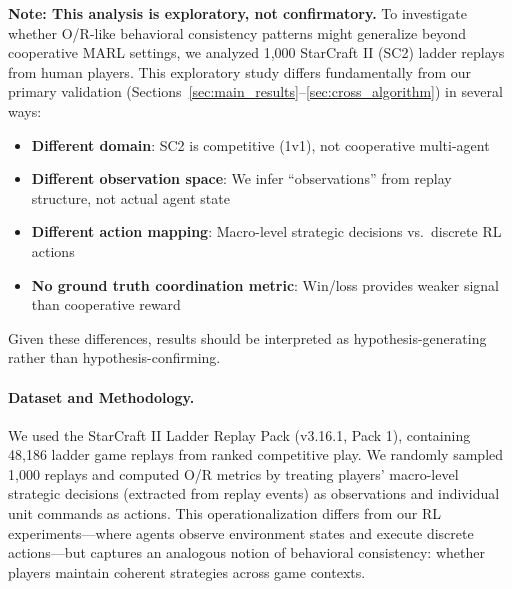 

\textbf{Note: This analysis is exploratory, not confirmatory.} To investigate whether O/R-like behavioral consistency patterns might generalize beyond cooperative MARL settings, we analyzed 1,000 StarCraft II (SC2) ladder replays from human players. This exploratory study differs fundamentally from our primary validation (Sections~\ref{sec:main_results}--\ref{sec:cross_algorithm}) in several ways:

\begin{itemize}
    \item \textbf{Different domain}: SC2 is competitive (1v1), not cooperative multi-agent
    \item \textbf{Different observation space}: We infer ``observations'' from replay structure, not actual agent state
    \item \textbf{Different action mapping}: Macro-level strategic decisions vs.\ discrete RL actions
    \item \textbf{No ground truth coordination metric}: Win/loss provides weaker signal than cooperative reward
\end{itemize}

\noindent Given these differences, results should be interpreted as hypothesis-generating rather than hypothesis-confirming.

\paragraph{Dataset and Methodology.}
We used the StarCraft II Ladder Replay Pack (v3.16.1, Pack 1), containing 48,186 ladder game replays from ranked competitive play. We randomly sampled 1,000 replays and computed O/R metrics by treating players' macro-level strategic decisions (extracted from replay events) as observations and individual unit commands as actions. This operationalization differs from our RL experiments---where agents observe environment states and execute discrete actions---but captures an analogous notion of behavioral consistency: whether players maintain coherent strategies across game contexts.

